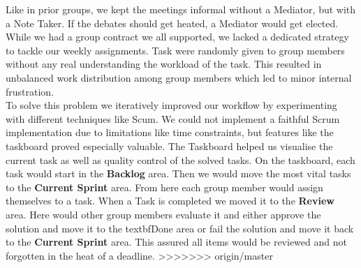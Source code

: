 Like in prior groups, we kept the meetings informal without a Mediator,  but with a Note Taker. If the debates should  get heated, a Mediator would get elected.
\\While we had a group contract we all supported, we lacked a dedicated strategy to tackle our weekly assignments. Task were randomly given to group members without any real understanding the workload of the task. This resulted in unbalanced work distribution among group members which led to minor internal frustration. \\
To solve this problem we iteratively improved our workflow by experimenting with  different techniques like Scum. We could not implement a faithful Scrum implementation due to limitations like time constraints, but features like the taskboard proved especially valuable. The Taskboard helped us visualise the current task as well as quality control of the solved tasks. On the taskboard, each task would start in the \textbf{Backlog} area. Then we would move the most vital tasks to the \textbf{Current Sprint} area. From here each group member would assign themselves to a task. When a Task is completed we moved it to the \textbf{Review} area.  Here would other group members evaluate it and either approve the solution and move it to the textbf{Done} area or fail the solution and move it back to the \textbf{Current Sprint} area. This assured all items would be reviewed and not forgotten in the heat of a deadline. 
>>>>>>> origin/master


